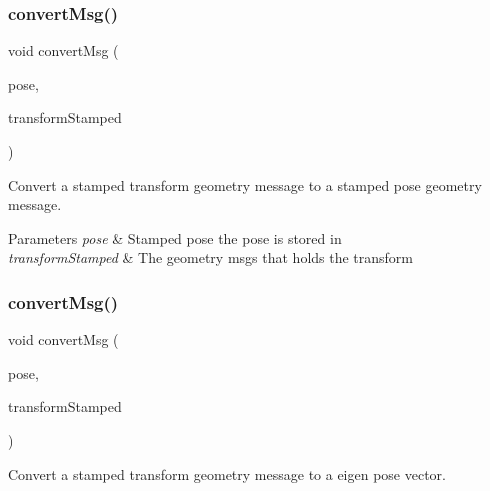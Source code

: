 \subsubsection{\texorpdfstring{convert\+Msg()}{convertMsg()}\hspace{0.1cm}{\footnotesize\ttfamily [11/14]}}
{\footnotesize\ttfamily void convert\+Msg (\begin{DoxyParamCaption}\item[{geometry\+\_\+msgs\+::\+Pose\+Stamped \&}]{pose,  }\item[{geometry\+\_\+msgs\+::\+Transform\+Stamped \&}]{transform\+Stamped }\end{DoxyParamCaption})\hspace{0.3cm}{\ttfamily [inline]}}



Convert a stamped transform geometry message to a stamped pose geometry message. 


\begin{DoxyParams}{Parameters}
{\em pose} & Stamped pose the pose is stored in \\
\hline
{\em transform\+Stamped} & The geometry msgs that holds the transform \\
\hline
\end{DoxyParams}
\mbox{\label{group__MultiRobotController_ga21e894dfe1e1216355db06776a630b09}} 
\subsubsection{\texorpdfstring{convert\+Msg()}{convertMsg()}\hspace{0.1cm}{\footnotesize\ttfamily [12/14]}}
{\footnotesize\ttfamily void convert\+Msg (\begin{DoxyParamCaption}\item[{Eigen\+::\+Matrix$<$ double, 7, 1 $>$ \&}]{pose,  }\item[{geometry\+\_\+msgs\+::\+Transform\+Stamped \&}]{transform\+Stamped }\end{DoxyParamCaption})\hspace{0.3cm}{\ttfamily [inline]}}



Convert a stamped transform geometry message to a eigen pose vector. 


